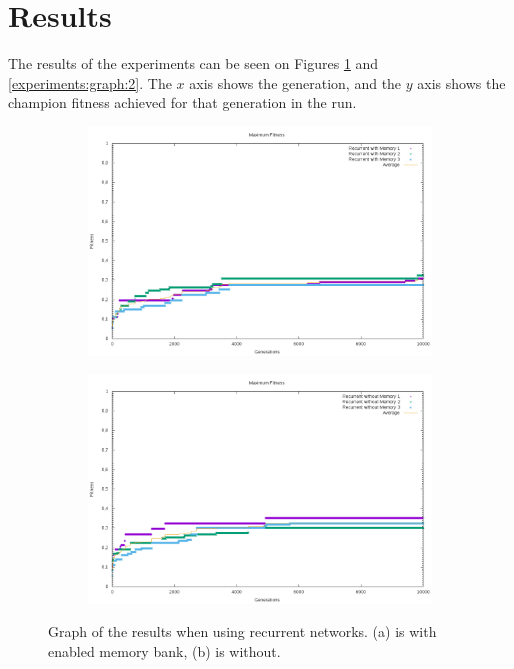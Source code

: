 
\section{Results}
The results of the experiments can be seen on Figures \ref{experiments:graph:1} and \ref{experiments:graph:2}. The $x$ axis shows the generation, and the $y$ axis shows the champion fitness achieved for that generation in the run.

\begin{figure}[ht]
	\begin{subfigure}{\textwidth}
		\includegraphics[width=\textwidth]{figures/recurrentmemory.png}
		\caption{}
	\end{subfigure}
	\begin{subfigure}{\textwidth}
		\includegraphics[width=\textwidth]{figures/recurrentnomemory.png}
		\caption{}
	\end{subfigure}
	\caption{Graph of the results when using recurrent networks. (a) is with enabled memory bank, (b) is without.}
	\label{experiments:graph:1}
\end{figure}

